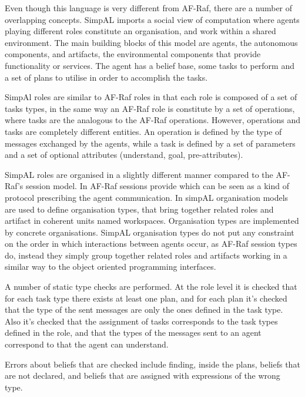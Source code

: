 \documentclass[a4paper,12pt,oneside,fleqn]{book} %
\begin{document}
Even though this language is very different from AF-Raf, there are a number
of overlapping concepts. SimpAL imports a social view of computation where
agents playing different roles constitute an organisation, and work within
a shared environment. The main building blocks of this model are agents,
the autonomous components, and artifacts, the environmental components that
provide functionality or services. The agent has a belief base, some tasks
to perform and a set of plans to utilise in order to accomplish the tasks.

SimpAl roles are similar to AF-Raf roles in that each role is composed of a
set of tasks types, in the same way an AF-Raf role is constitute by a set
of operations, where tasks are the analogous to the AF-Raf operations.
However, operations and tasks are completely different entities. An
operation is defined by the type of messages exchanged by the agents, while
a task is defined by a set of parameters and a set of optional attributes
(understand, goal, pre-attributes).

SimpAL roles are organised in a slightly different manner compared to the
AF-Raf's session model. In AF-Raf sessions provide  which can be seen as a kind of protocol
prescribing the agent communication. In simpAL organisation models are used
to define organisation types, that bring together related roles and
artifact in coherent units named workspaces. Organisation types are
implemented by concrete organisations. SimpAL organisation types do not put
any constraint on the order in which interactions between agents occur, as
AF-Raf session types do, instead they simply group together related roles
and artifacts working in a similar way to the object oriented programming
interfaces.

A number of static type checks are performed. At the role level it is
checked that for each task type there exists at least one plan, and for
each plan it's checked that the type of the sent messages are only the ones
defined in the task type. Also it's checked that the assignment of tasks
corresponds to the task types defined in the role, and that the types of
the messages sent to an agent correspond to that the agent can understand.

Errors about beliefs that are checked include finding, inside the plans,
beliefs that are not declared, and beliefs that are assigned with
expressions of the wrong type.
\end{document}
